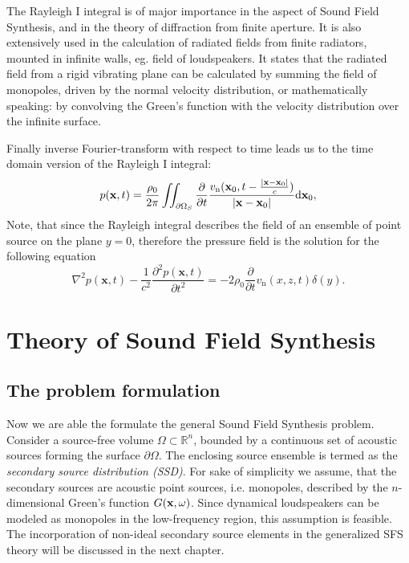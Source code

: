 The Rayleigh I integral is of major importance in the aspect of Sound Field Synthesis, and in the theory of diffraction from finite aperture. It is also extensively used in the calculation of radiated fields from finite radiators, mounted in infinite walls, eg. field of loudspeakers. It states that the radiated field from a rigid vibrating plane can be calculated by summing the field of monopoles, driven by the normal velocity distribution, or mathematically speaking: by convolving the Green's function with the velocity distribution over the infinite surface.

\vspace{3mm}
Finally inverse Fourier-transform with respect to time leads us to the time domain version of the Rayleigh I integral\cite{Pierce1991}:
\begin{equation}
p(\mathbf{x},t) = \frac{\rho_0}{2\pi} \iint_{\partial \Omega_S} \frac{\partial}{\partial t} \frac{v_{\mathrm{n}}(\mathbf{x}_0,t-\frac{ | \mathbf{x}-\mathbf{x}_0 | }{c})}{| \mathbf{x}-\mathbf{x}_0 |} \mathrm{d} \mathbf{x}_0,
\end{equation}
Note, that since the Rayleigh integral describes the field of an ensemble of point source on the plane $y = 0$, therefore the pressure field is the solution for the following equation \cite{Pierce1991}
\begin{equation}
\nabla^2 p(\mathbf{x},t) - \frac{1}{c^2}\frac{\partial^2 p(\mathbf{x},t)}{\partial t^2} = -2\rho_0 \frac{\partial}{\partial t} v_{\mathrm{n}}(x,z,t)\delta(y).
\end{equation}

\newpage

\section{Theory of Sound Field Synthesis}

\subsection{The problem formulation}

Now we are able the formulate the general Sound Field Synthesis problem. Consider a source-free volume $\Omega \subset \mathbb{R}^n$, bounded by a continuous set of acoustic sources forming the surface $\partial \Omega$. The enclosing source ensemble is termed as the \emph{secondary source distribution (SSD)}.
For sake of simplicity we assume, that the secondary sources are acoustic point sources, i.e. monopoles, described by the $n$-dimensional Green's function $G(\mathbf{x},\omega)$. Since dynamical loudspeakers can be modeled as monopoles in the low-frequency region, this assumption is feasible. The incorporation of non-ideal secondary source elements in the generalized SFS theory will be discussed in the next chapter.


